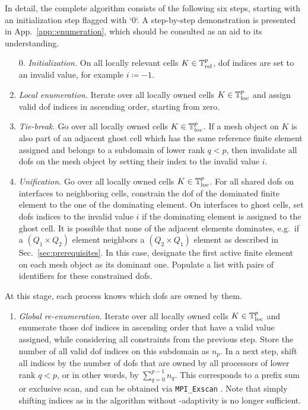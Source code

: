 In detail, the complete algorithm consists of the following six steps, starting with an initialization step flagged with `0`. A step-by-step demonstration is presented in App.~\ref{app::enumeration}, which should be consulted as an aid to its understanding.
\begin{enumerate}
  \item[0.] \textit{Initialization.}
  On all locally relevant cells $K \in \mathbb{T}^p_{\text{rel}}$, \gls{dof} indices are set to an invalid value, for example $i \coloneqq -1$.
  \item \textit{Local enumeration.}
  Iterate over all locally owned cells $K \in \mathbb{T}^p_{\text{loc}}$ and assign valid \gls{dof} indices in ascending order, starting from zero.
  \item \textit{Tie-break.}
  Go over all locally owned cells $K \in \mathbb{T}^p_{\text{loc}}$. If a mesh object on $K$ is also part of an adjacent ghost cell which has the same reference finite element assigned and belongs to a subdomain of lower rank $q < p$, then invalidate all \glspl{dof} on the mesh object by setting their index to the invalid value $i$.
  \item \textit{Unification.}
  Go over all locally owned cells $K \in \mathbb{T}^p_{\text{loc}}$. For all shared \glspl{dof} on interfaces to neighboring cells, constrain the \gls{dof} of the dominated finite element to the one of the dominating element. On interfaces to ghost cells, set \glspl{dof} indices to the invalid value $i$ if the dominating element is assigned to the ghost cell. It is possible that none of the adjacent elements dominates, e.g.\ if a $(Q_1 \times Q_2)$ element neighbors a $(Q_2 \times Q_1)$ element as described in Sec.~\ref{sec:prerequisites}. In this case, designate the first active finite element on each mesh object as its dominant one.
  Populate a list with pairs of identifiers for these constrained \glspl{dof}.
\end{enumerate}
At this stage, each process knows which \glspl{dof} are owned by them.
\begin{enumerate}[resume]
  \item \textit{Global re-enumeration.}
  Iterate over all locally owned cells $K \in \mathbb{T}^p_{\text{loc}}$
  and enumerate those \gls{dof} indices in ascending order that have a valid value assigned, while considering all constraints from the previous step. Store the number of all valid \gls{dof} indices on this subdomain as $n_p$. In a next step, shift all indices by the number of \glspl{dof} that are owned by all processors of lower rank $q < p$, or in other words, by $\sum_{q=0}^{p-1} n_q$. This corresponds to a prefix sum or exclusive scan, and can be obtained via \texttt{MPI\_Exscan} \textcite{mpi31}. Note that simply shifting indices as in the algorithm without \p-adaptivity is no longer sufficient.
\end{enumerate}
